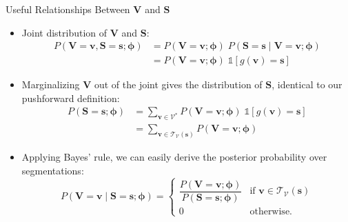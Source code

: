 \documentclass[11pt,compress,t,notes=noshow, xcolor=table]{beamer}
\newcommand{\vocab}{\mathcal{V}}
\newcommand{\probs}{\boldsymbol{\phi}}
\begin{document}
\begin{frame}{Useful Relationships Between $\mathbf{V}$ and $\mathbf{S}$}

\vfill

\begin{itemize}
\item Joint distribution of $\mathbf{V}$ and $\mathbf{S}$:
\begin{align*}
P(\mathbf{V}=\mathbf{v}, \mathbf{S}=\mathbf{s}; \probs) &= P(\mathbf{V}=\mathbf{v}; \probs)\; P(\mathbf{S}=\mathbf{s} \mid \mathbf{V}=\mathbf{v}; \probs)\\&= P(\mathbf{V}=\mathbf{v}; \probs)\;\mathds{1}[g(\mathbf{v}) = \mathbf{s}]
\end{align*}
\item Marginalizing $\mathbf{V}$ out of the joint gives the distribution of $\mathbf{S}$, identical to our pushforward definition:
\begin{align*}
P(\mathbf{S}=\mathbf{s}; \probs) &= \sum_{\mathbf{v} \in \vocab^*} P(\mathbf{V}=\mathbf{v}; \probs)\;\mathds{1}[g(\mathbf{v}) = \mathbf{s}]\\
&= \sum_{\mathbf{v} \in \mathcal{T}_{\vocab}(\mathbf{s})} P(\mathbf{V}=\mathbf{v}; \probs)
\end{align*}
\item Applying Bayes' rule, we can easily derive the posterior probability over segmentations:
\begin{equation*}
P(\mathbf{V} = \mathbf{v} \mid \mathbf{S} = \mathbf{s}; \probs) =
\begin{cases}
  \dfrac{P(\mathbf{V} = \mathbf{v}; \probs)}{P(\mathbf{S} = \mathbf{s}; \probs)} & \text{if } \mathbf{v} \in \mathcal{T}_{\vocab}(\mathbf{s}) \\[1ex]
  0 & \text{otherwise.}
\end{cases}
\end{equation*}
\end{itemize}

\vfill


\end{frame}
\end{document}
